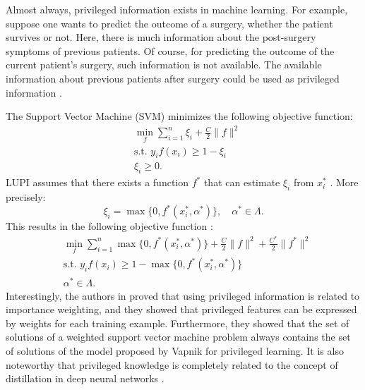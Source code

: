 	Almost always, privileged information exists in machine learning. For example, suppose one wants to predict the outcome of a surgery, whether the patient survives or not. Here, there is much information about the post-surgery symptoms of previous patients. Of course, for predicting the outcome of the current patient's surgery, such information is not available. The available information about previous patients after surgery could be used as privileged information \cite{vapnik2015learning}.
	
	The Support Vector Machine (SVM) minimizes the following objective function:
	\begin{subequations}
		\label{eq:svm-obj}
		\begin{align}
			&\min_{f} \sum_{i=1}^{n} \xi_i + \frac{C}{2}\|f\|^2 \\
			&\text{s.t. } y_i f(x_i) \ge 1 - \xi_i \\
			&\xi_i \ge 0.
		\end{align}
	\end{subequations}
	LUPI assumes that there exists a function $f^*$ that can estimate $\xi_i$ from $x_i^*$ \cite{pekovic2013support}. More precisely:
	\begin{equation}
		\xi_i = \max\{0, f^*(x_i^*, \alpha^*)\}, \quad \alpha^* \in \Lambda.
	\end{equation}
	This results in the following objective function \cite{vapnik2015learning}:
	\begin{subequations}
		\label{eq:lupi-obj}
		\begin{align}
			&\min_{f} \sum_{i=1}^{n} \max\{0, f^*(x_i^*, \alpha^*)\} + \frac{C}{2}\|f\|^2 + \frac{C^*}{2}\|f^*\|^2 \\
			&\text{s.t. } y_i f(x_i) \ge 1 - \max\{0, f^*(x_i^*, \alpha^*)\} \\
			&\alpha^* \in \Lambda.
		\end{align}
	\end{subequations}
	Interestingly, the authors in \cite{lapedriza2013privileged} proved that using privileged information is related to importance weighting, and they showed that privileged features can be expressed by weights for each training example. Furthermore, they showed that the set of solutions of a weighted support vector machine problem always contains the set of solutions of the model proposed by Vapnik for privileged learning. It is also noteworthy that privileged knowledge is completely related to the concept of distillation in deep neural networks \cite{hinton2015distilling}.
	
